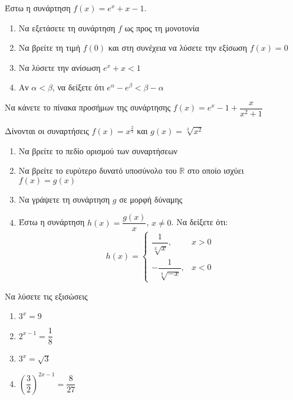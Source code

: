 \documentclass[greek]{beamer}
\begin{document}
\begin{askisi}
  Έστω η συνάρτηση $f(x)=e^x+x-1$.
  \begin{enumerate}
    \item<1-> Να εξετάσετε τη συνάρτηση $f$ ως προς τη μονοτονία
    \item<2-> Να βρείτε τη τιμή $f(0)$ και στη συνέχεια να λύσετε την εξίσωση $f(x)=0$
    \item<3-> Να λύσετε την ανίσωση $e^x+x<1$
    \item<4-> Αν $α<β$, να δείξετε ότι $e^α-e^β<β-α$
  \end{enumerate}


\end{askisi}

\begin{askisi}
  Να κάνετε το πίνακα προσήμων της συνάρτησης $f(x)=e^x-1+\dfrac{x}{x^2+1}$


\end{askisi}

\begin{askisi}
  Δίνονται οι συναρτήσεις $f(x)=x^{\frac{2}{3}}$ και $g(x)=\sqrt[3]{x^2}$
  \begin{enumerate}
    \item<1-> Να βρείτε το πεδίο ορισμού των συναρτήσεων
    \item<2-> Να βρείτε το ευρύτερο δυνατό υποσύνολο του $\mathbb{R}$ στο οποίο ισχύει $f(x)=g(x)$
    \item<3-> Να γράψετε τη συνάρτηση $g$ σε μορφή δύναμης
    \item<4-> Έστω η συνάρτηση $h(x)=\dfrac{g(x)}{x}$, $x\ne 0$. Να δείξετε ότι:
          $$h(x)=\begin{cases}
              \dfrac{1}{\sqrt[3]{x}},   & x>0 \\
              -\dfrac{1}{\sqrt[3]{-x}}, & x<0
            \end{cases}$$
  \end{enumerate}


\end{askisi}

\begin{askisi}
  Να λύσετε τις εξισώσεις
  \begin{enumerate}
    \item<1-> $3^x=9$
    \item<2-> $2^{x-1}=\dfrac{1}{8}$
    \item<3-> $3^x=\sqrt{3}$
    \item<4-> $\left( \dfrac{3}{2} \right)^{2x-1}=\dfrac{8}{27}$
  \end{enumerate}


\end{askisi}
\end{document}
